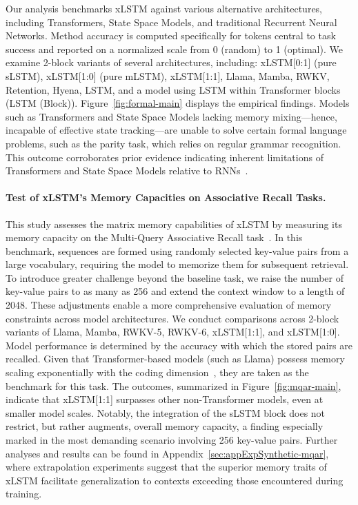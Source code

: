 Our analysis benchmarks xLSTM against various alternative architectures, including Transformers, State Space Models, and traditional Recurrent Neural Networks. Method accuracy is computed specifically for tokens central to task success and reported on a normalized scale from 0 (random) to 1 (optimal). We examine 2-block variants of several architectures, including: xLSTM[0:1] (pure sLSTM), xLSTM[1:0] (pure mLSTM), xLSTM[1:1], Llama, Mamba, RWKV, Retention, Hyena, LSTM, and a model using LSTM within Transformer blocks (LSTM (Block)). Figure~\ref{fig:formal-main} displays the empirical findings. Models such as Transformers and State Space Models lacking memory mixing—hence, incapable of effective state tracking—are unable to solve certain formal language problems, such as the parity task, which relies on regular grammar recognition. This outcome corroborates prior evidence indicating inherent limitations of Transformers and State Space Models relative to RNNs~\citep{Merrill:24, Merrill:23, Deletang:23}.

\paragraph{Test of xLSTM's Memory Capacities on Associative Recall Tasks.} This study assesses the matrix memory capabilities of xLSTM by measuring its memory capacity on the Multi-Query Associative Recall task~\citep{Arora:23arxiv}. In this benchmark, sequences are formed using randomly selected key-value pairs from a large vocabulary, requiring the model to memorize them for subsequent retrieval. To introduce greater challenge beyond the baseline task, we raise the number of key-value pairs to as many as 256 and extend the context window to a length of 2048. These adjustments enable a more comprehensive evaluation of memory constraints across model architectures. We conduct comparisons across 2-block variants of Llama, Mamba, RWKV-5, RWKV-6, xLSTM[1:1], and xLSTM[1:0]. Model performance is determined by the accuracy with which the stored pairs are recalled. Given that Transformer-based models (such as Llama) possess memory scaling exponentially with the coding dimension~\citep{Ramsauer:21}, they are taken as the benchmark for this task. The outcomes, summarized in Figure~\ref{fig:mqar-main}, indicate that xLSTM[1:1] surpasses other non-Transformer models, even at smaller model scales. Notably, the integration of the sLSTM block does not restrict, but rather augments, overall memory capacity, a finding especially marked in the most demanding scenario involving 256 key-value pairs. Further analyses and results can be found in Appendix~\ref{sec:appExpSynthetic-mqar}, where extrapolation experiments suggest that the superior memory traits of xLSTM facilitate generalization to contexts exceeding those encountered during training.

